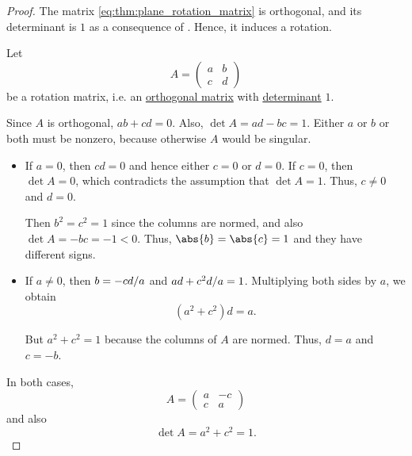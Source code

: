 \begin{proof}
   The matrix \eqref{eq:thm:plane_rotation_matrix} is orthogonal, and its determinant is \( 1 \) as a consequence of . Hence, it induces a rotation.

   Let
  \begin{equation*}
    A
    =
    \begin{pmatrix}
      a & b \\
      c & d
    \end{pmatrix}
  \end{equation*}
  be a rotation matrix, i.e. an \hyperref[def:unitary_matrix]{orthogonal matrix} with \hyperref[def:matrix_determinant]{determinant} \( 1 \).

  Since \( A \) is orthogonal, \( ab + cd = 0 \). Also, \( \det A = ad - bc = 1 \). Either \( a \) or \( b \) or both must be nonzero, because otherwise \( A \) would be singular.
  \begin{itemize}
    \item If \( a = 0 \), then \( cd = 0 \) and hence either \( c = 0 \) or \( d = 0 \). If \( c = 0 \), then \( \det A = 0 \), which contradicts the assumption that \( \det A = 1 \). Thus, \( c \neq 0 \) and \( d = 0 \).

    Then \( b^2 = c^2 = 1 \) since the columns are normed, and also \( \det A = -bc = -1 < 0 \). Thus, \( \abs{b} = \abs{c} = 1 \) and they have different signs.

    \item If \( a \neq 0 \), then \( b = -\ifrac {cd} a \) and \( ad + \ifrac {c^2 d} a = 1 \). Multiplying both sides by \( a \), we obtain
    \begin{equation*}
      (a^2 + c^2) d = a.
    \end{equation*}

    But \( a^2 + c^2 = 1 \) because the columns of \( A \) are normed. Thus, \( d = a \) and \( c = -b \).
  \end{itemize}

  In both cases,
  \begin{equation*}
    A
    =
    \begin{pmatrix}
      a & -c \\
      c & a
    \end{pmatrix}
  \end{equation*}
  and also
  \begin{equation*}
    \det A = a^2 + c^2 = 1.
  \end{equation*}


\end{proof}
